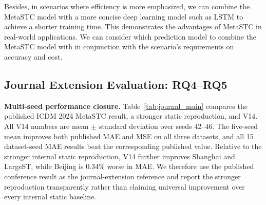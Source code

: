 \documentclass[lettersize,journal]{IEEEtran}
\begin{document}
\color{blue}

Besides, in scenarios where efficiency is more emphasized, we can combine the MetaSTC model with a more concise deep learning model such as LSTM to achieve a shorter training time. This demonstrates the advantages of MetaSTC in real-world applications. We can consider which prediction model to combine the MetaSTC model with in conjunction with the scenario's requirements on accuracy and cost.



\subsection{Journal Extension Evaluation: RQ4--RQ5}
\label{sec:journal_eval}
\textbf{Multi-seed performance closure.} Table~\ref{tab:journal_main} compares the published ICDM 2024 MetaSTC result, a stronger static reproduction, and V14. All V14 numbers are mean $\pm$ standard deviation over seeds 42--46. The five-seed mean improves both published MAE and MSE on all three datasets, and all 15 dataset-seed MAE results beat the corresponding published value. Relative to the stronger internal static reproduction, V14 further improves Shanghai and LargeST, while Beijing is 0.34\% worse in MAE. We therefore use the published conference result as the journal-extension reference and report the stronger reproduction transparently rather than claiming universal improvement over every internal static baseline.

\begin{table}[!t]
\centering
\caption{Five-seed journal evaluation under the official LSTM $L=12$ protocol. Lower is better. ``Wins'' counts seeds that improve the published MetaSTC target.}
\label{tab:journal_main}
\end{table}
\end{document}
